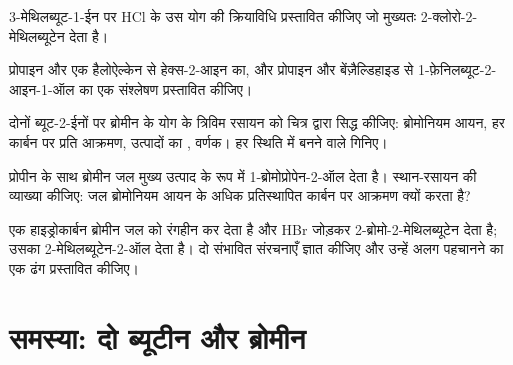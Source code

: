 \begin{exercise}[$\star\star$]\label{exo:b1:electrophilic-additions:8}
3-मेथिलब्यूट-1-ईन पर HCl के उस योग की क्रियाविधि प्रस्तावित कीजिए जो
मुख्यतः 2-क्लोरो-2-मेथिलब्यूटेन देता है।
\end{exercise}

\begin{exercise}[$\star\star$]\label{exo:b1:electrophilic-additions:9}
प्रोपाइन और एक हैलोऐल्केन से हेक्स-2-आइन का, और
प्रोपाइन और बेंज़ैल्डिहाइड से 1-फ़ेनिलब्यूट-2-आइन-1-ऑल का एक संश्लेषण प्रस्तावित कीजिए।
\end{exercise}

\begin{exercise}[$\star\star\star$]\label{exo:b1:electrophilic-additions:10}
दोनों ब्यूट-2-ईनों पर ब्रोमीन के योग के त्रिविम रसायन को
चित्र द्वारा सिद्ध कीजिए: ब्रोमोनियम आयन, हर कार्बन पर प्रति आक्रमण, उत्पादों का ,
वर्णक। हर स्थिति में बनने वाले 
गिनिए।
\end{exercise}

\begin{exercise}[$\star\star\star$]\label{exo:b1:electrophilic-additions:11}
प्रोपीन के साथ ब्रोमीन जल मुख्य उत्पाद के रूप में 1-ब्रोमोप्रोपेन-2-ऑल देता है।
स्थान-रसायन की व्याख्या कीजिए: जल ब्रोमोनियम आयन के अधिक प्रतिस्थापित
कार्बन पर आक्रमण क्यों करता है?
\end{exercise}

\begin{exercise}[$\star\star\star$]\label{exo:b1:electrophilic-additions:12}
एक हाइड्रोकार्बन  ब्रोमीन जल को रंगहीन कर देता है और HBr जोड़कर
2-ब्रोमो-2-मेथिलब्यूटेन देता है; उसका  2-मेथिलब्यूटेन-2-ऑल देता है। दो
संभावित संरचनाएँ ज्ञात कीजिए और उन्हें अलग पहचानने का एक ढंग प्रस्तावित कीजिए।
\end{exercise}

\section{समस्या: दो ब्यूटीन और ब्रोमीन}

